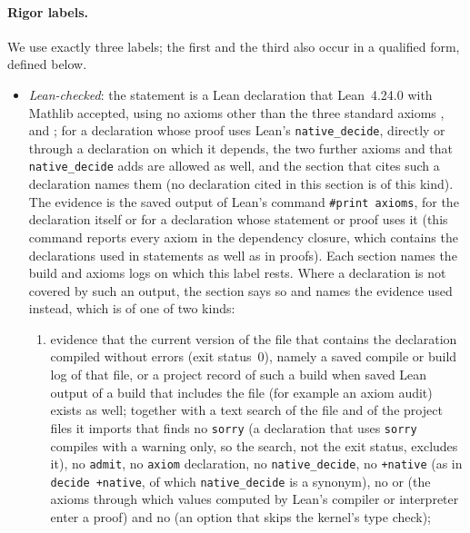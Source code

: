 \paragraph{Rigor labels.}
We use exactly three labels; the first and the third also occur in a qualified form, defined below.
\begin{itemize}
\item \emph{Lean-checked}: the statement is a Lean declaration that Lean~4.24.0 with Mathlib
   accepted, using no axioms other than the three standard axioms ,
   and ; for a declaration whose proof uses Lean's
  \texttt{native\_decide}, directly or through a declaration on which it depends, the two further axioms
   and  that \texttt{native\_decide} adds are allowed as
  well, and the section that cites such a declaration names them (no declaration cited in this section is
  of this kind). The evidence is the saved output of
  Lean's command \texttt{\#print axioms}, for the declaration itself or for a declaration whose statement
  or proof uses it (this command reports every axiom in the dependency closure, which contains the
  declarations used in statements as well as in proofs). Each section names the build and axioms logs
  on which this label rests. Where a declaration is not covered by such an output, the section says so
  and names the evidence used instead, which is of one of two kinds:
  \begin{enumerate}[label=(\alph*)]
  \item evidence that the current version of the file that contains the declaration compiled without
    errors (exit status~$0$), namely a saved compile or build log of that file, or a project record of
    such a build when saved Lean output of a build that includes the file (for example an axiom audit)
    exists as well; together with a text search of the file and of the project files it imports that
    finds no \texttt{sorry} (a declaration that uses \texttt{sorry} compiles with a warning only, so the
    search, not the exit status, excludes it), no \texttt{admit}, no \texttt{axiom} declaration, no
    \texttt{native\_decide}, no \texttt{+native} (as in \texttt{decide +native}, of which
    \texttt{native\_decide} is a synonym), no  or  (the
    axioms through which values computed by Lean's compiler or interpreter enter a proof) and no
     (an option that skips the kernel's type check);

\end{enumerate}
\end{itemize}
